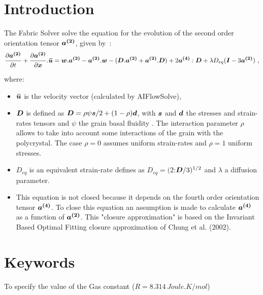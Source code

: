 \section{Introduction}
The Fabric Solver solve the equation for the evolution of the second order orientation tensor
${{\boldsymbol{a^{(2)}}}}$,  given by~:
\begin{equation}
\label{eqn:da/dt}
\sur{\partial \ak{2}}{\partial t}+\sur{\partial \ak{2}}{\partial \vect{x}}.\vect{\bar{u}} 
 =  \Mat{w}.\ak{2} - \ak{2}.\Mat{w} - (\Mat{D}.\ak{2}+\ak{2}.\Mat{D})+
  2\ak{4}:\Mat{D} + \lambda D_{eq} (\Mat{I} -3 \ak{2}) \ \textrm{,}
\end{equation}
where:
\begin{itemize}
\item ${\boldsymbol{\bar{u}}}$ is the velocity vector (calculated by AIFlowSolve),
\item ${{\boldsymbol{D}}}$ is defined as ${{\boldsymbol{D}}}=\rho \psi {{\boldsymbol{s}}}/2 + (1-\rho) {{\boldsymbol{d}}}$,
with ${{\boldsymbol{s}}}$ and ${{\boldsymbol{d}}}$ the stresses and strain-rates tensors and $\psi$
the grain basal fluidity . The interaction 
parameter $\rho$ allows to take into account some interactions of the grain with the 
polycrystal. The case $\rho=0$ assumes uniform strain-rates and $\rho=1$ uniform stresses.
\item $D_{eq}$ is an equivalent strain-rate defines as $D_{eq}=(2$:${{\boldsymbol{D}}}/3)^{1/2}$ and
$\lambda$ a diffusion parameter.
\item This equation is not closed because it depends on the fourth order orientation tensor
${{\boldsymbol{a^{(4)}}}}$. To close this equation an assumption is made to calculate ${{\boldsymbol{a^{(4)}}}}$ as a function
of ${{\boldsymbol{a^{(2)}}}}$. This "closure approximation" is based on the Invariant Based Optimal Fitting
closure approximation of Chung et al. (2002).
\end{itemize}


 \section{Keywords}

 \sifbegin {} \sifbegin {}
 To specify the value of the Gas constant ($R=8.314\,Joule.K/mol$)
%
 \sifend

%

